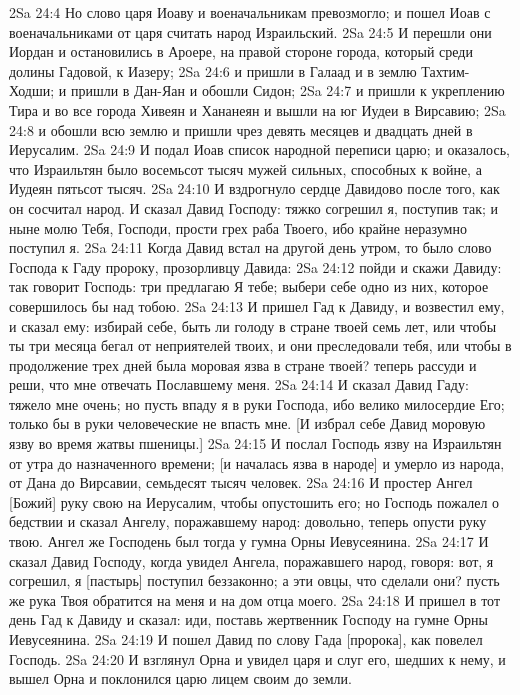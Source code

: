 \vs 2Sa 24:4 Но слово царя Иоаву и военачальникам превозмогло; и пошел Иоав с военачальниками от царя считать народ Израильский.
\vs 2Sa 24:5 И перешли они Иордан и остановились в Ароере, на правой стороне города, который среди долины Гадовой, к Иазеру;
\vs 2Sa 24:6 и пришли в Галаад и в землю Тахтим-Ходши; и пришли в Дан-Яан и обошли Сидон;
\vs 2Sa 24:7 и пришли к укреплению Тира и во все города Хивеян и Хананеян и вышли на юг Иудеи в Вирсавию;
\vs 2Sa 24:8 и обошли всю землю и пришли чрез девять месяцев и двадцать дней в Иерусалим.
\vs 2Sa 24:9 И подал Иоав список народной переписи царю; и оказалось, что Израильтян было восемьсот тысяч мужей сильных, способных к войне, а Иудеян пятьсот тысяч.
\rsbpar\vs 2Sa 24:10 И вздрогнуло сердце Давидово после того, как он сосчитал народ. И сказал Давид Господу: тяжко согрешил я, поступив так; и ныне молю Тебя, Господи, прости грех раба Твоего, ибо крайне неразумно поступил я.
\vs 2Sa 24:11 Когда Давид встал на другой день утром, то было слово Господа к Гаду пророку, прозорливцу Давида:
\vs 2Sa 24:12 пойди и скажи Давиду: так говорит Господь: три  предлагаю Я тебе; выбери себе одно из них, которое совершилось бы над тобою.
\vs 2Sa 24:13 И пришел Гад к Давиду, и возвестил ему, и сказал ему: избирай себе, быть ли голоду в стране твоей семь лет, или чтобы ты три месяца бегал от неприятелей твоих, и они преследовали тебя, или чтобы в продолжение трех дней была моровая язва в стране твоей? теперь рассуди и реши, что мне отвечать Пославшему меня.
\vs 2Sa 24:14 И сказал Давид Гаду: тяжело мне очень; но пусть впаду я в руки Господа, ибо велико милосердие Его; только бы в руки человеческие не впасть мне. [И избрал себе Давид моровую язву во время жатвы пшеницы.]
\vs 2Sa 24:15 И послал Господь язву на Израильтян от утра до назначенного времени; [и началась язва в народе] и умерло из народа, от Дана до Вирсавии, семьдесят тысяч человек.
\vs 2Sa 24:16 И простер Ангел [Божий] руку свою на Иерусалим, чтобы опустошить его; но Господь пожалел о бедствии и сказал Ангелу, поражавшему народ: довольно, теперь опусти руку твою. Ангел же Господень был тогда у гумна Орны Иевусеянина.
\vs 2Sa 24:17 И сказал Давид Господу, когда увидел Ангела, поражавшего народ, говоря: вот, я согрешил, я [пастырь] поступил беззаконно; а эти овцы, что сделали они? пусть же рука Твоя обратится на меня и на дом отца моего.
\vs 2Sa 24:18 И пришел в тот день Гад к Давиду и сказал: иди, поставь жертвенник Господу на гумне Орны Иевусеянина.
\vs 2Sa 24:19 И пошел Давид по слову Гада [пророка], как повелел Господь.
\vs 2Sa 24:20 И взглянул Орна и увидел царя и слуг его, шедших к нему, и вышел Орна и поклонился царю лицем своим до земли.
